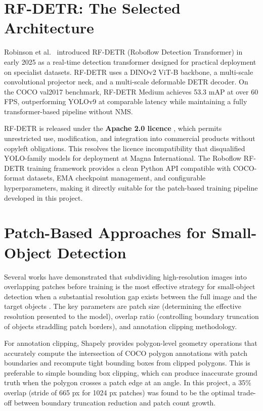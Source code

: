 \section{RF-DETR: The Selected Architecture}

Robinson et al.\ \cite{robinson2025} introduced RF-DETR (Roboflow Detection Transformer) in early 2025 as a real-time detection transformer designed for practical deployment on specialist datasets. RF-DETR uses a DINOv2 ViT-B backbone, a multi-scale convolutional projector neck, and a multi-scale deformable DETR decoder. On the COCO val2017 benchmark, RF-DETR Medium achieves 53.3 mAP at over 60 FPS, outperforming YOLOv9 at comparable latency while maintaining a fully transformer-based pipeline without NMS.

RF-DETR is released under the \textbf{Apache 2.0 licence} \cite{roboflow_rfdetr}, which permits unrestricted use, modification, and integration into commercial products without copyleft obligations. This resolves the licence incompatibility that disqualified YOLO-family models for deployment at Magna International. The Roboflow RF-DETR training framework \cite{roboflow_rfdetr} provides a clean Python API compatible with COCO-format datasets, EMA checkpoint management, and configurable hyperparameters, making it directly suitable for the patch-based training pipeline developed in this project.

\section{Patch-Based Approaches for Small-Object Detection}

Several works have demonstrated that subdividing high-resolution images into overlapping patches before training is the most effective strategy for small-object detection when a substantial resolution gap exists between the full image and the target objects \cite{lin2014}. The key parameters are patch size (determining the effective resolution presented to the model), overlap ratio (controlling boundary truncation of objects straddling patch borders), and annotation clipping methodology.

For annotation clipping, Shapely \cite{shapely} provides polygon-level geometry operations that accurately compute the intersection of COCO polygon annotations with patch boundaries and recompute tight bounding boxes from clipped polygons. This is preferable to simple bounding box clipping, which can produce inaccurate ground truth when the polygon crosses a patch edge at an angle. In this project, a 35\% overlap (stride of 665 px for 1024 px patches) was found to be the optimal trade-off between boundary truncation reduction and patch count growth.

